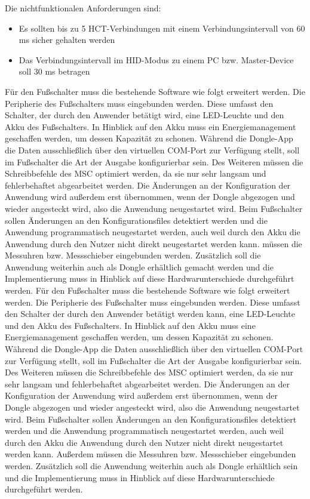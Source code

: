 Die nichtfunktionalen Anforderungen sind:
\begin{itemize}
	\item Es sollten bis zu 5 HCT-Verbindungen mit einem Verbindungsintervall von 60 ms sicher gehalten werden
	\item Das Verbindungsintervall im HID-Modus zu einem PC bzw. Master-Device soll 30 ms betragen
\end{itemize}

Für den Fußschalter muss die bestehende Software wie folgt erweitert werden. Die Peripherie des Fußschalters muss eingebunden werden. Diese umfasst den Schalter, der durch den Anwender betätigt wird, eine LED-Leuchte und den Akku des Fußschalters. In Hinblick auf den Akku muss ein Energiemanagement geschaffen werden, um dessen Kapazität zu schonen. Während die Dongle-App die Daten ausschließlich über den virtuellen COM-Port zur Verfügung stellt, soll im Fußschalter die Art der Ausgabe konfigurierbar sein. Des Weiteren müssen die Schreibbefehle des \ac{MSC} optimiert werden, da sie nur sehr langsam und fehlerbehaftet abgearbeitet werden. Die Änderungen an der Konfiguration der Anwendung wird außerdem erst übernommen, wenn der Dongle abgezogen und wieder angesteckt wird, also die Anwendung neugestartet wird. Beim Fußschalter sollen Änderungen an den Konfigurationsfiles detektiert werden und die Anwendung programmatisch neugestartet werden, auch weil durch den Akku die Anwendung durch den Nutzer nicht direkt neugestartet werden kann.  müssen die Messuhren bzw. Messschieber eingebunden werden. Zusätzlich soll die Anwendung weiterhin auch als Dongle erhältlich gemacht werden und die Implementierung muss in Hinblick auf diese Hardwarunterschiede durchgeführt werden. 
Für den Fußschalter muss die bestehende Software wie folgt erweitert werden. Die Peripherie des Fußschalter muss eingebunden werden. Diese umfasst den Schalter der durch den Anwender betätigt werden kann, eine LED-Leuchte und den Akku des Fußschalters. In Hinblick auf den Akku muss eine Energiemanagement geschaffen werden, um dessen Kapazität zu schonen. Während die Dongle-App die Daten ausschließlich über den virtuellen COM-Port zur Verfügung stellt, soll im Fußschalter die Art der Ausgabe konfigurierbar sein. Des Weiteren müssen die Schreibbefehle des \ac{MSC} optimiert werden, da sie nur sehr langsam und fehlerbehaftet abgearbeitet werden. Die Änderungen an der Konfiguration der Anwendung wird außerdem erst übernommen, wenn der Dongle abgezogen und wieder angesteckt wird, also die Anwendung neugestartet wird. Beim Fußschalter sollen Änderungen an den Konfigurationsfiles detektiert werden und die Anwendung programmatisch neugestartet werden, auch weil durch den Akku die Anwendung durch den Nutzer nicht direkt neugestartet werden kann. Außerdem müssen die Messuhren bzw. Messschieber eingebunden werden. Zusätzlich soll die Anwendung weiterhin auch als Dongle erhältlich sein und die Implementierung muss in Hinblick auf diese Hardwarunterschiede durchgeführt werden. 